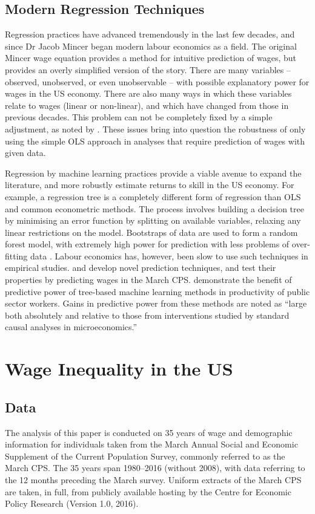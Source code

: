 \documentclass[notitlepage,12pt]{article}
\newcommand{\1}[1]{\ensuremath{\mathbb{1}\left( #1 \right)}}               %
\begin{document}
\subsection{Modern Regression Techniques}

Regression practices have advanced tremendously in the last few decades, and since Dr Jacob Mincer began modern labour economics as a field.  The original Mincer wage equation provides a method for intuitive prediction of wages, but provides an overly simplified version of the story.  There are many variables -- observed, unobserved, or even unobservable -- with possible explanatory power for wages in the US economy.  There are also many ways in which these variables relate to wages (linear or non-linear), and which have changed from those in previous decades.  This problem can not be completely fixed by a simple adjustment, as noted by \cite{lemieux2006increasing}.  These issues bring into question the robustness of only using the simple OLS approach in analyses that require prediction of wages with given data.

Regression by machine learning practices provide a viable avenue to expand the literature, and more robustly estimate returns to skill in the US economy.  For example, a regression tree is a completely different form of regression than OLS and common econometric methods.  The process involves building a decision tree by minimising an error function by splitting on available variables, relaxing any linear restrictions on the model.  Bootstraps of data are used to form a random forest model, with extremely high power for prediction with less problems of over-fitting data \citep{breiman2001random}.  Labour economics  has, however, been slow to use such techniques in empirical studies.  \cite{belloni2011high} and \cite{abadie2017risk} develop novel prediction techniques, and test their properties by predicting wages in the March CPS.  \cite{chalfin2016productivity} demonstrate the benefit of predictive power of tree-based machine learning methods in productivity of public sector workers.  Gains in predictive power from these methods are noted as ``large both absolutely and relative to those from interventions studied by standard causal analyses in microeconomics.''

\section{Wage Inequality in the US}
\label{wageinequality}
\subsection{Data}
The analysis of this paper is conducted on 35 years of wage and demographic information for individuals taken from the March Annual Social and Economic Supplement of the Current Population Survey, commonly referred to as the March CPS.  The 35 years span 1980--2016 (without 2008), with data referring to the 12 months preceding the March survey.  Uniform extracts of the March CPS are taken, in full, from publicly available hosting by the Centre for Economic Policy Research \nocite{center} (Version 1.0, 2016).
\end{document}

